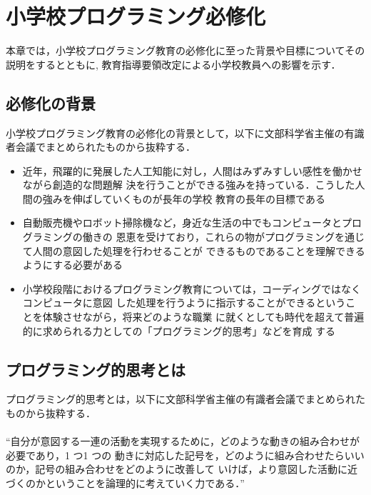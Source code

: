 \newpage

\section{\rm 小学校プログラミング必修化}
本章では，小学校プログラミング教育の必修化に至った背景や目標についてその説明をするとともに, 教育指導要領改定による小学校教員への影響を示す．

\subsection{必修化の背景}
小学校プログラミング教育の必修化の背景として，以下に文部科学省主催の有識者会議でまとめられたものから抜粋する．


\begin{itemize}
 \item 近年，飛躍的に発展した人工知能に対し，人間はみずみすしい感性を働かせながら創造的な問題解
決を行うことができる強みを持っている．こうした人間の強みを伸ばしていくものが長年の学校
教育の長年の目標である\\

 \item 自動販売機やロボット掃除機など，身近な生活の中でもコンピュータとプログラミングの働きの
恩恵を受けており，これらの物がプログラミングを通じて人間の意図した処理を行わせることが
できるものであることを理解できるようにする必要がある\\

 \item 小学校段階におけるプログラミング教育については，コーディングではなくコンピュータに意図
した処理を行うように指示することができるということを体験させながら，将来どのような職業
に就くとしても時代を超えて普遍的に求められる力としての「プログラミング的思考」などを育成
する
\end{itemize}

\subsection{プログラミング的思考とは}
プログラミング的思考とは，以下に文部科学省主催の有識者会議でまとめられたものから抜粋する．
\\
\\
``自分が意図する一連の活動を実現するために，どのような動きの組み合わせが必要であり，1 つ1 つの
動きに対応した記号を，どのように組み合わせたらいいのか，記号の組み合わせをどのように改善して
いけば，より意図した活動に近づくのかということを論理的に考えていく力である．''



